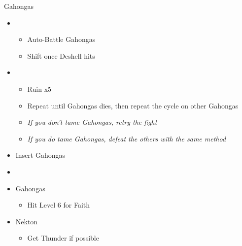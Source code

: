 \begin{battle}{Gahongas}
	\begin{itemize}
		\item \third
		      \begin{itemize}
			      \item Auto-Battle Gahongas
			      \item Shift once Deshell hits
		      \end{itemize}
		\item \first
		      \begin{itemize}
			      \item Ruin x5
			      \item Repeat until Gahongas dies, then repeat the cycle on other Gahongas
			      \item \textit{If you don't tame Gahongas, retry the fight}
			      \item \textit{If you do tame Gahongas, defeat the others with the same method}
		      \end{itemize}
	\end{itemize}
\end{battle}

\begin{menu}
	\begin{itemize}
		\paradigm
		\begin{itemize}
			\item Insert Gahongas
			\item {}%
			      {\paradigmline{\com}{\com}{\nek}{\X}}%
			      {\paradigmline{(\rav)}{(\rav)}{(\gah)}{\W}}%
			      {\paradigmline{\rav}{\sab}{\nek}{\W}}%
			      {\paradigmline{\sen}{\sen}{\nek}{\W}}%
			      {\paradigmline{\rav}{\rav}{\nek}{\W}}%
			      {\paradigmline[6]{\textit{\rav}}{\textit{\rav}}{\textit{\nek}}{\textit{\W}}}
		\end{itemize}
		\crystarium
		\begin{itemize}
			\item Gahongas
			      \begin{itemize}
				      \item Hit Level 6 for Faith
			      \end{itemize}
			\item Nekton
			      \begin{itemize}
				      \item Get Thunder if possible
			      \end{itemize}
		\end{itemize}
	\end{itemize}
\end{menu}